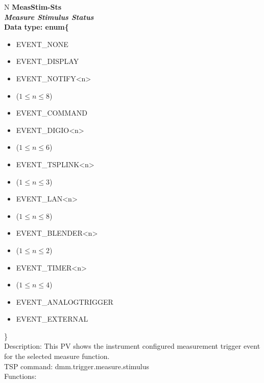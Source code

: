 \documentclass[openany]{article}
\begin{document}
		\begin{tabular}{N}
			\hline
			\bfseries MeasStim-Sts\label{pv:measstim-sts} \\ \hline
			\emph{Measure Stimulus Status} \\
			Data type: enum\{\begin{itemize}[noitemsep]
				\small
				\item[] EVENT\_NONE
				\item[] EVENT\_DISPLAY
				\item[] EVENT\_NOTIFY\textless n\textgreater
				\item[] ($1\leq n\leq 8$)
				\item[] EVENT\_COMMAND
				\item[] EVENT\_DIGIO\textless n\textgreater
				\item[] ($1\leq n\leq 6$)
				\item[] EVENT\_TSPLINK\textless n\textgreater
				\item[] ($1\leq n\leq 3$)
				\item[] EVENT\_LAN\textless n\textgreater
				\item[] ($1\leq n\leq 8$)
				\item[] EVENT\_BLENDER\textless n\textgreater
				\item[] ($1\leq n\leq 2$)
				\item[] EVENT\_TIMER\textless n\textgreater
				\item[] ($1\leq n\leq 4$)
				\item[] EVENT\_ANALOGTRIGGER
				\item[] EVENT\_EXTERNAL
			\end{itemize}\} \\
			Description: This PV shows the instrument configured measurement trigger event for the selected measure function. \\
			TSP command: dmm.trigger.measure.stimulus \\
			Functions: \\
			\arrayrulecolor{\FuncTableBorderColor}

		\end{tabular}
\end{document}
